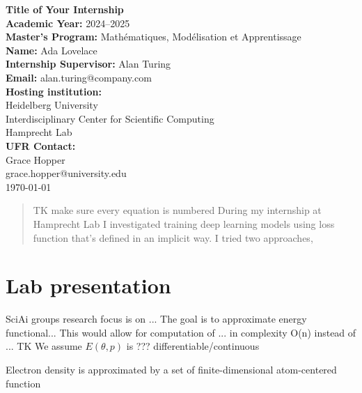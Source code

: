 \documentclass[a4paper,10pt]{report}
\author{Łukasz Adamowicz}
\begin{document}
\begin{titlepage}
    \begin{center}
        \textbf{\Large Title of Your Internship}\\[2cm]
        \textbf{Academic Year:} 2024--2025\\
        \textbf{Master's Program:} Mathématiques, Modélisation et Apprentissage\\
        \textbf{Name:} Ada Lovelace\\[1cm]
        \textbf{Internship Supervisor:} Alan Turing\\
        \textbf{Email:} alan.turing@company.com\\[1cm]
        \textbf{Hosting institution:}\\
        Heidelberg University\\
        Interdisciplinary Center for Scientific Computing\\
        Hamprecht Lab\\[1cm]
        \textbf{UFR Contact:}\\
        Grace Hopper\\
        grace.hopper@university.edu\\[2cm]

        \vfill
        \today
    \end{center}
\end{titlepage}


\begin{abstract}
TK make sure every equation is numbered
During my internship at Hamprecht Lab I investigated training deep learning models using loss function that's defined in an implicit way. I tried two approaches,
\end{abstract}


\tableofcontents

\section{Lab presentation}
SciAi groups research focus is on ...
The goal is to approximate energy functional...
This would allow for computation of ... in complexity O(n) instead of ...
TK
We assume $E(\theta, p)$ is ??? differentiable/continuous

Electron density is approximated by a set of finite-dimensional  atom-centered function
\end{document}
